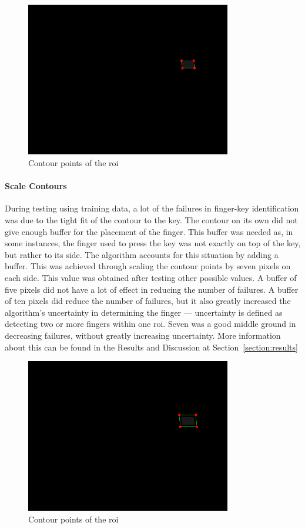 \documentclass{report}
\begin{document}
\begin{figure}[H]
	\centering
	\includegraphics[width=0.8\textwidth]{key-contour.png}
	\caption{Contour points of the \ac{roi}}
	\centering
\end{figure}

\paragraph{Scale Contours}
During testing using training data, a lot of the failures in finger-key
identification was due to the tight fit of the contour to the key. The contour
on its own did not give enough buffer for the placement of the finger. This
buffer was needed as, in some instances, the finger used to press the key was
not exactly on top of the key, but rather to its side. The algorithm accounts
for this situation by adding a buffer. This was achieved through scaling the
contour points by seven pixels on each side. This value was obtained after
testing other possible values. A buffer of five pixels did not have a lot of
effect in reducing the number of failures. A buffer of ten pixels did reduce the
number of failures, but it also greatly increased the algorithm's uncertainty in
determining the finger --- uncertainty is defined as detecting two or more
fingers within one \ac{roi}. Seven was a good middle ground in decreasing
failures, without greatly increasing uncertainty. More information about this
can be found in the Results and Discussion at Section~\ref{section:results}

\begin{figure}[H]
	\centering
	\includegraphics[width=0.8\textwidth]{scaled-contour.png}
	\caption{Contour points of the \ac{roi}}
	\centering
\end{figure}
\end{document}
